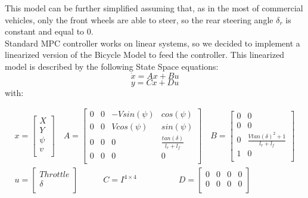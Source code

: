 This model can be further simplified assuming that, as in the most of commercial vehicles, only the front wheels are able to steer, so the rear steering angle $\delta_r$ is constant and equal to 0.\\
Standard MPC controller works on linear systems, so we decided to implement a linearized version of the Bicycle Model to feed the controller. This linearized model is described by the following State Space equations:
\begin{equation}
    \label{equation:dynamic1}
    \Dot{x} = Ax + Bu 
\end{equation}
\begin{equation}
    \label{equation:dynamic2}
    y = Cx + Du 
\end{equation}
with:

\begin{equation}
\label{equation:sys_bicycle_kin}
   \begin{aligned}
    x = 
        \begin{bmatrix} %
        X \\ 
        Y \\
        \psi \\
        v \\
        \end{bmatrix}\quad
    A =
        \begin{bmatrix} %
       0 & 0 & -Vsin(\psi) & cos(\psi)\\ 
       0 & 0 & Vcos(\psi) & sin(\psi) \\
       0 & 0 & 0 & \frac{tan(\delta)}{l_r + l_f}\\
       0 & 0 & 0 & 0 \\
        \end{bmatrix}\quad
    B = 
        \begin{bmatrix} %
        0 & 0\\ 
        0 & 0 \\
        0 & \frac{Vtan(\delta)^2 + 1}{l_r + l_f}\\
        1 & 0 \\
        \end{bmatrix}\\[10pt]
    u =
        \begin{bmatrix} %
        Throttle \\
        \delta \\
        \end{bmatrix}\quad\quad\quad
    C = I^{4\times 4}\quad\quad\quad\quad\quad
    D =
        \begin{bmatrix} %
      0 & 0 & 0 & 0\\
      0 & 0 & 0 & 0\\
        \end{bmatrix}
    \end{aligned}
\end{equation} 

